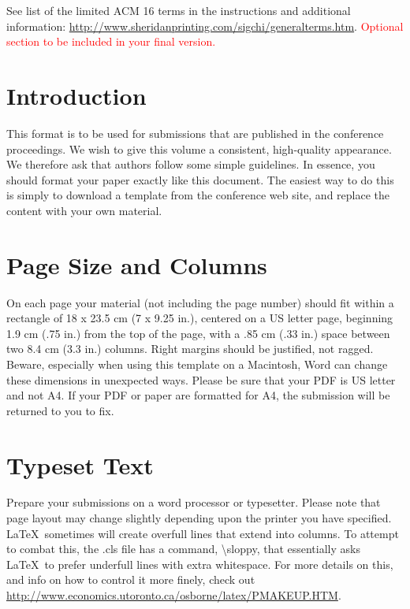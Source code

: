 \documentclass{sigchi}
\begin{document}
See list of the limited ACM 16 terms in the
instructions and additional information:
\url{http://www.sheridanprinting.com/sigchi/generalterms.htm}.
\textcolor{red}{Optional section to be included in your final version.}

\section{Introduction}

This format is to be used for submissions that are
published in the conference proceedings.  We wish to give
this volume a consistent, high-quality appearance. We
therefore ask that authors follow some simple
guidelines. In essence, you should format your paper
exactly like this document. The easiest way to do this is
simply to download a template from the conference web
site, and replace the content with your own material.

\section{Page Size and Columns}

On each page your material (not including the page number) should fit
within a rectangle of 18 x 23.5 cm (7 x 9.25 in.), centered on a US
letter page, beginning 1.9 cm (.75 in.) from the top of the page, with
a .85 cm (.33 in.) space between two 8.4 cm (3.3 in.) columns.  Right
margins should be justified, not ragged. Beware, especially when using
this template on a Macintosh, Word can change these dimensions in
unexpected ways. Please be sure that your PDF is US letter and not
A4. If your PDF or paper are formatted for A4, the submission will be
returned to you to fix.

\section{Typeset Text}

Prepare your submissions on a word processor or typesetter.  Please
note that page layout may change slightly depending upon the printer
you have specified.  \LaTeX\ sometimes will create overfull lines
that extend into columns.  To attempt to combat this, the .cls
file has a command, {\textbackslash}sloppy, that essentially asks
\LaTeX\ to prefer underfull lines with extra whitespace.  For more
details on this, and info on how to control it more finely, check out
{\url{http://www.economics.utoronto.ca/osborne/latex/PMAKEUP.HTM}}.
\end{document}
